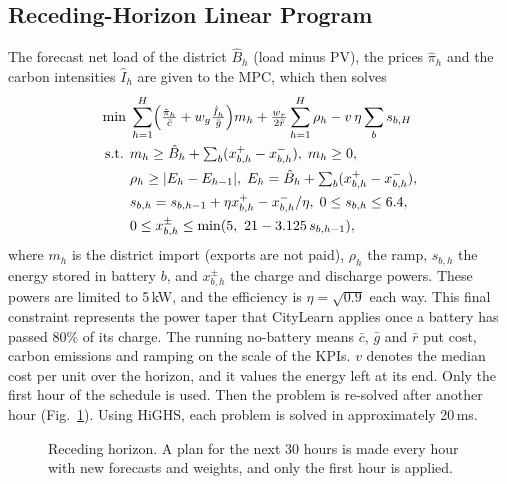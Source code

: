 \documentclass[conference]{IEEEtran}
\begin{document}
\subsection{Receding-Horizon Linear Program}\label{sec:mpc}
The forecast net load of the district $\hat B_h$ (load minus PV), the prices $\hat\pi_h$ and the carbon intensities
$\hat I_h$ are given to the MPC, which then solves
\begin{equation}
\begin{split}
\min\; & \sum_{h=1}^{H} \Bigl(\tfrac{\hat\pi_h}{\bar c} + w_g \tfrac{\hat I_h}{\bar g}\Bigr) m_h
        + \tfrac{w_r}{2\bar r} \sum_{h=1}^{H} \rho_h - v\,\eta \sum_b s_{b,H} \\
\text{s.t. } & m_h \ge \hat B_h + \textstyle\sum_b (x^+_{b,h} - x^-_{b,h}),\; m_h \ge 0, \\
& \rho_h \ge |E_h - E_{h-1}|,\; E_h = \hat B_h + \textstyle\sum_b (x^+_{b,h} - x^-_{b,h}), \\
& s_{b,h} = s_{b,h-1} + \eta x^+_{b,h} - x^-_{b,h}/\eta,\; 0 \le s_{b,h} \le 6.4, \\
& 0 \le x^\pm_{b,h} \le \min(5,\ 21 - 3.125\, s_{b,h-1}),
\end{split}
\label{eq:lp}
\end{equation}
where $m_h$ is the district import (exports are not paid), $\rho_h$ the ramp, $s_{b,h}$ the energy stored in battery
$b$, and $x^\pm_{b,h}$ the charge and discharge powers. These powers are limited to 5\,kW, and the efficiency is
$\eta=\sqrt{0.9}$ each way. This final constraint represents the power taper that CityLearn applies once a battery has
passed 80\% of its charge. The running no-battery means $\bar c$, $\bar g$ and $\bar r$ put cost, carbon emissions and
ramping on the scale of the KPIs. $v$ denotes the median cost per unit over the horizon, and it values the energy left at
its end. Only the first hour of the schedule is used. Then the problem is re-solved after another hour
(Fig.~\ref{fig:horizon}). Using HiGHS, each problem is solved in approximately 20\,ms.

\begin{figure}[!t]
\centering
{}
\caption{Receding horizon. A plan for the next 30 hours is made every hour with new forecasts and weights, and only the
first hour is applied.}
\label{fig:horizon}
\end{figure}
\end{document}
